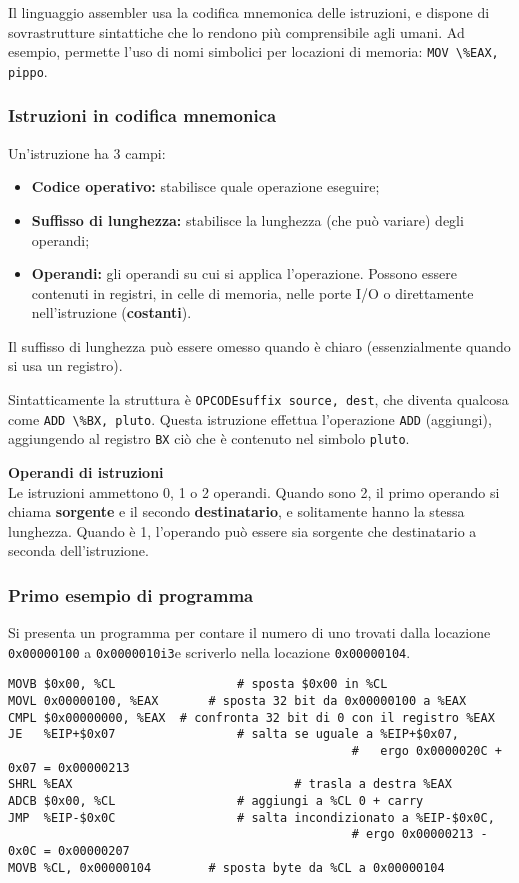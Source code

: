 \documentclass[a4paper,11pt]{article}
\begin{document}
Il linguaggio assembler usa la codifica mnemonica delle istruzioni, e dispone di sovrastrutture sintattiche che lo rendono più comprensibile agli umani.
Ad esempio, permette l'uso di nomi simbolici per locazioni di memoria: \lstinline|MOV \%EAX, pippo|.

\subsubsection{Istruzioni in codifica mnemonica}
Un'istruzione ha 3 campi:
\begin{itemize}
	\item \textbf{Codice operativo:} stabilisce quale operazione eseguire;
	\item \textbf{Suffisso di lunghezza:} stabilisce la lunghezza (che può variare) degli operandi;	
	\item \textbf{Operandi:} gli operandi su cui si applica l'operazione. 
		Possono essere contenuti in registri, in celle di memoria, nelle porte I/O o direttamente nell'istruzione (\textbf{costanti}).
\end{itemize}

Il suffisso di lunghezza può essere omesso quando è chiaro (essenzialmente quando si usa un registro).

Sintatticamente la struttura è \lstinline|OPCODEsuffix source, dest|, che diventa qualcosa come \lstinline|ADD \%BX, pluto|.
Questa istruzione effettua l'operazione \lstinline|ADD| (aggiungi), aggiungendo al registro \lstinline|BX| ciò che è contenuto nel simbolo \lstinline|pluto|.

\par\medskip
\noindent
\textsf{\textbf{Operandi di istruzioni}} \\
Le istruzioni ammettono 0, 1 o 2 operandi.
Quando sono 2, il primo operando si chiama \textbf{sorgente} e il secondo \textbf{destinatario}, e solitamente hanno la stessa lunghezza.
Quando è 1, l'operando può essere sia sorgente che destinatario a seconda dell'istruzione.

\subsubsection{Primo esempio di programma}

Si presenta un programma per contare il numero di uno trovati dalla locazione \lstinline|0x00000100| a \lstinline|0x0000010i3|e scriverlo nella locazione \lstinline|0x00000104|. 

\begin{lstlisting}[style=codestyle]	
MOVB $0x00, %CL					# sposta $0x00 in %CL
MOVL 0x00000100, %EAX		# sposta 32 bit da 0x00000100 a %EAX
CMPL $0x00000000, %EAX	# confronta 32 bit di 0 con il registro %EAX
JE   %EIP+$0x07					# salta se uguale a %EIP+$0x07, 
												#	ergo 0x0000020C + 0x07 = 0x00000213
SHRL %EAX								# trasla a destra %EAX
ADCB $0x00, %CL					# aggiungi a %CL 0 + carry 
JMP  %EIP-$0x0C					# salta incondizionato a %EIP-$0x0C,
												# ergo 0x00000213 - 0x0C = 0x00000207
MOVB %CL, 0x00000104		# sposta byte da %CL a 0x00000104
\end{lstlisting}
\end{document}
